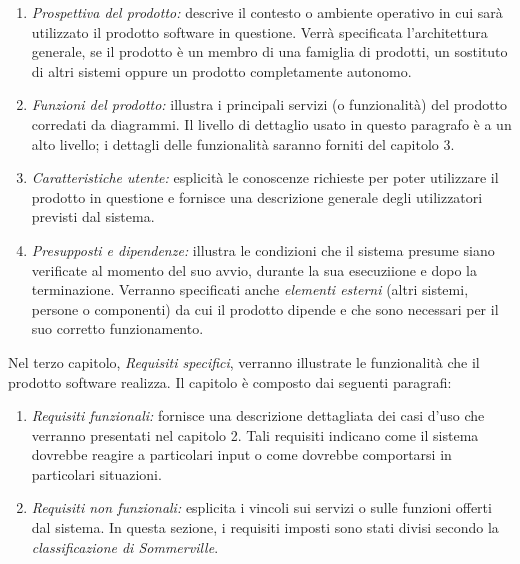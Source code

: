 \begin{enumerate}
  \item \textit{Prospettiva del prodotto:} descrive il contesto o ambiente operativo in cui sarà utilizzato il prodotto software in questione. Verrà specificata l'architettura generale, se il prodotto è un membro di una famiglia di prodotti, un sostituto di altri sistemi oppure un prodotto completamente autonomo.
  \item \textit{Funzioni del prodotto:} illustra i principali servizi (o funzionalità) del prodotto 
  corredati da diagrammi. Il livello di dettaglio usato in questo paragrafo è a un alto livello; i dettagli delle funzionalità saranno forniti del capitolo 3.
  \item \textit{Caratteristiche utente:} esplicità le conoscenze richieste per poter utilizzare il prodotto in questione e fornisce una descrizione generale degli utilizzatori previsti dal sistema.
  \item \textit{Presupposti e dipendenze:} illustra le condizioni che il sistema presume siano verificate al momento del suo avvio, durante la sua esecuziione e dopo la terminazione. Verranno specificati anche \textit{elementi esterni} (altri sistemi, persone o componenti) da cui il prodotto dipende e che sono necessari per il suo corretto funzionamento.
\end{enumerate}

Nel terzo capitolo, \textit{Requisiti specifici}, verranno illustrate le funzionalità che il prodotto software realizza. Il capitolo è composto dai seguenti paragrafi:

\begin{enumerate}
  \item \textit{Requisiti funzionali:} fornisce una descrizione dettagliata dei casi d'uso che verranno presentati nel capitolo 2. Tali requisiti indicano come il sistema dovrebbe reagire a particolari input o come dovrebbe comportarsi in particolari situazioni.
  \item \textit{Requisiti non funzionali:} esplicita i vincoli sui servizi o sulle funzioni offerti dal sistema. In questa sezione, i requisiti imposti sono stati divisi secondo la \textit{classificazione di Sommerville}.
\end{enumerate}








